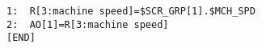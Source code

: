 \begin{verbatim}
1:	R[3:machine speed]=$SCR_GRP[1].$MCH_SPD
2:	AO[1]=R[3:machine speed]
[END]
\end{verbatim}
